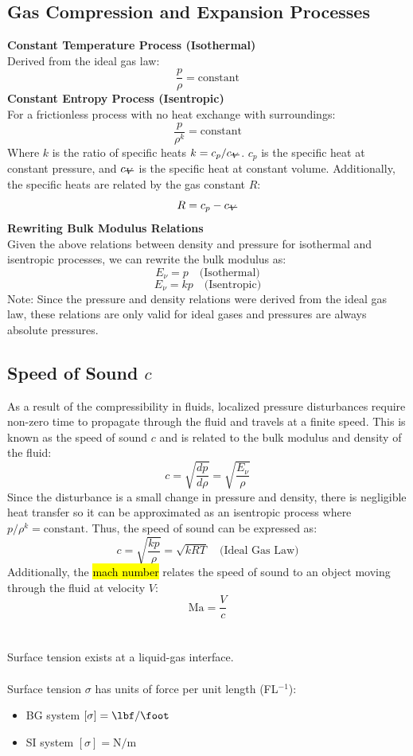 ﻿\documentclass[12pt]{article}
\newcommand{\vol}{\mathord{\text{\ooalign{\hidewidth $V$\hidewidth\cr\kern-0.5pt\raisebox{0.8ex}{\rule[0pt]{1em}{0.5pt}}}}}}
\begin{document}
\subsection*{Gas Compression and Expansion Processes}
\textbf{Constant Temperature Process (Isothermal)}\\
Derived from the ideal gas law:
\[\frac{p}{\rho} = \text{constant}\]
\textbf{Constant Entropy Process (Isentropic)}\\
For a frictionless process with no heat exchange with surroundings:
\[\frac{p}{\rho^k} = \text{constant}\]
Where $k$ is the ratio of specific heats $k = c_p/c_{\vol}$. $c_p$ is the specific heat at constant pressure, and $c_{\vol}$ is the specific heat at constant volume. Additionally, the specific heats are related by the gas constant $R$:
\[R = c_p - c_{\vol}\]
\textbf{Rewriting Bulk Modulus Relations}\\
Given the above relations between density and pressure for isothermal and isentropic processes, we can rewrite the bulk modulus as:
\[E_\nu = p\quad \text{(Isothermal)}\]
\[E_\nu = kp\quad \text{(Isentropic)}\]
Note: Since the pressure and density relations were derived from the ideal gas law, these relations are only valid for ideal gases and pressures are always absolute pressures.
\subsection*{Speed of Sound $c$}
As a result of the compressibility in fluids, localized pressure disturbances require non-zero time to propagate through the fluid and travels at a finite speed. This is known as the speed of sound $c$ and is related to the bulk modulus and density of the fluid:
\[c =\sqrt{\frac{dp}{d\rho}} = \sqrt{\frac{E_\nu}{\rho}}\]
Since the disturbance is a small change in pressure and density, there is negligible heat transfer so it can be approximated as an isentropic process where $p/\rho^k = \text{constant}$. Thus, the speed of sound can be expressed as:
\[c = \sqrt{\frac{kp}{\rho}} = \sqrt{kRT} \quad \text{(Ideal Gas Law)}\]
Additionally, the \hl{mach number} relates the speed of sound to an object moving through the fluid at velocity $V$:
\[\text{Ma} = \frac{V}{c}\]
\section*{}
Surface tension exists at a liquid-gas interface.\\\\
Surface tension $\sigma$ has units of force per unit length (FL$^{-1}$):
\begin{itemize}
    \item BG system $[\sigma] = \unit{\lbf\per\foot}$
    \item SI system $[\sigma] = \unit{\newton\per\meter}$
\end{itemize}
\end{document}
